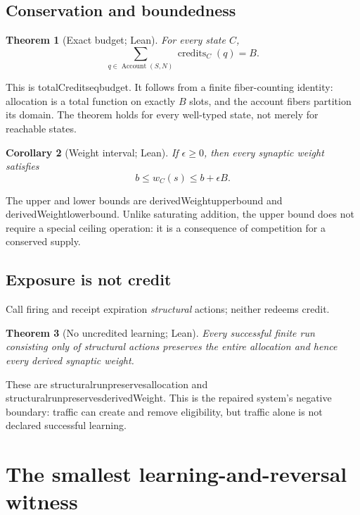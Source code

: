 \documentclass[11pt]{article}
\newtheorem{theorem}{Theorem}[section]
\newtheorem{corollary}[theorem]{Corollary}
\newcommand{\Account}{\operatorname{Account}}
\newcommand{\Credits}{\operatorname{credits}}
\newcommand{\leanname}[1]{{\scriptsize\ttfamily
  \def\_{\textunderscore\allowbreak}#1}}
\begin{document}
\subsection{Conservation and boundedness}

\begin{theorem}[Exact budget; Lean]
For every state $C$,
\[
  \sum_{q\in\Account(S,N)}\Credits_C(q)=B.
\]
\end{theorem}

This is \leanname{totalCredits\_eq\_budget}.  It follows from a finite
fiber-counting identity: allocation is a total function on exactly $B$ slots,
and the account fibers partition its domain.  The theorem holds for every
well-typed state, not merely for reachable states.

\begin{corollary}[Weight interval; Lean]
If $\epsilon\geq0$, then every synaptic weight satisfies
\[
  b\leq w_C(s)\leq b+\epsilon B.
\]
\end{corollary}

The upper and lower bounds are
\leanname{derivedWeight\_upper\_bound} and
\leanname{derivedWeight\_lower\_bound}.  Unlike saturating addition, the
upper bound does not require a special ceiling operation: it is a consequence
of competition for a conserved supply.

\subsection{Exposure is not credit}

Call firing and receipt expiration \emph{structural} actions; neither redeems
credit.

\begin{theorem}[No uncredited learning; Lean]
Every successful finite run consisting only of structural actions preserves
the entire allocation and hence every derived synaptic weight.
\end{theorem}

These are \leanname{structural\_run\_preserves\_allocation} and
\leanname{structural\_run\_preserves\_derivedWeight}.  This is the repaired
system's negative boundary: traffic can create and remove eligibility, but
traffic alone is not declared successful learning.

\section{The smallest learning-and-reversal witness}
\label{sec:canary}
\end{document}
